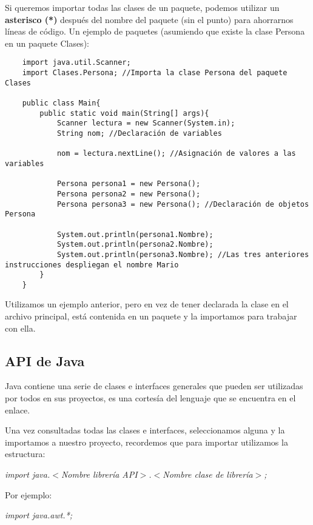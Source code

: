 Si queremos importar todas las clases de un paquete, podemos utilizar un \textbf{asterisco (*)} después del nombre del paquete (sin el punto) para ahorrarnos líneas de código. Un ejemplo de paquetes (asumiendo que existe la clase Persona en un paquete Clases):
\begin{lstlisting}
    import java.util.Scanner;
    import Clases.Persona; //Importa la clase Persona del paquete Clases
    
    public class Main{
        public static void main(String[] args){
            Scanner lectura = new Scanner(System.in);
            String nom; //Declaración de variables
            
            nom = lectura.nextLine(); //Asignación de valores a las variables
            
            Persona persona1 = new Persona();
            Persona persona2 = new Persona();
            Persona persona3 = new Persona(); //Declaración de objetos Persona
            
            System.out.println(persona1.Nombre);
            System.out.println(persona2.Nombre);
            System.out.println(persona3.Nombre); //Las tres anteriores instrucciones despliegan el nombre Mario
        }
    }
\end{lstlisting}

Utilizamos un ejemplo anterior, pero en vez de tener declarada la clase en el archivo principal, está contenida en un paquete y la importamos para trabajar con ella.


\subsection{API de Java}
\hspace{0.55cm}Java contiene una serie de clases e interfaces generales que pueden ser utilizadas por todos en sus proyectos, es una cortesía del lenguaje que se encuentra en el enlace.

Una vez consultadas todas las clases e interfaces, seleccionamos alguna y la importamos a nuestro proyecto, recordemos que para importar utilizamos la estructura:
\begin{center}
    \textit{import java.$<$Nombre librería API$>$.$<$Nombre clase de librería$>$;}
\end{center}

Por ejemplo:
\begin{center}
    \textit{import java.awt.*;}
\end{center}

